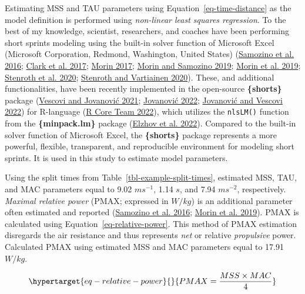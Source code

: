 \documentclass[
  letterpaper,
  DIV=11,
  numbers=noendperiod]{scrartcl}
\begin{document}
Estimating MSS and TAU parameters using Equation~\ref{eq-time-distance}
as the model definition is performed using \emph{non-linear least
squares regression}. To the best of my knowledge, scientist,
researchers, and coaches have been performing short sprints modeling
using the built-in solver function of Microsoft Excel (Microsoft
Corporation, Redmond, Washington, United States)
(\protect\hyperlink{ref-samozinoSimpleMethodMeasuring2016}{Samozino et
al. 2016}; \protect\hyperlink{ref-clarkNFLCombine40Yard2017}{Clark et
al. 2017};
\protect\hyperlink{ref-morinSpreadsheetSprintAcceleration2017}{Morin
2017};
\protect\hyperlink{ref-morinSpreadsheetSprintAcceleration2019}{Morin and
Samozino 2019};
\protect\hyperlink{ref-morinSimpleMethodComputing2019}{Morin et al.
2019};
\protect\hyperlink{ref-stenrothForcevelocityProfilingIce2020}{Stenroth
et al. 2020};
\protect\hyperlink{ref-stenrothSpreadsheetSprintAcceleration2020}{Stenroth
and Vartiainen 2020}). These, and additional functionalities, have been
recently implemented in the open-source \textbf{\{shorts\}} package
(\protect\hyperlink{ref-vescoviSprintMechanicalCharacteristics2021}{Vescovi
and Jovanović 2021}; \protect\hyperlink{ref-R-shorts}{Jovanović 2022};
\protect\hyperlink{ref-jovanovic2022}{Jovanović and Vescovi 2022}) for
R-language (\protect\hyperlink{ref-R-base}{R Core Team 2022}), which
utilizes the \texttt{nlsLM()} function from the \textbf{\{minpack.lm\}}
package (\protect\hyperlink{ref-R-minpack.lm}{Elzhov et al. 2022}).
Compared to the built-in solver function of Microsoft Excel, the
\textbf{\{shorts\}} package represents a more powerful, flexible,
transparent, and reproducible environment for modeling short sprints. It
is used in this study to estimate model parameters.

Using the split times from Table~\ref{tbl-example-split-times},
estimated MSS, TAU, and MAC parameters equal to 9.02 \(ms^{-1}\), 1.14
\(s\), and 7.94 \(ms^{-2}\), respectively. \emph{Maximal relative power}
(PMAX; expressed in \(W/kg\)) is an additional parameter often estimated
and reported
(\protect\hyperlink{ref-samozinoSimpleMethodMeasuring2016}{Samozino et
al. 2016}; \protect\hyperlink{ref-morinSimpleMethodComputing2019}{Morin
et al. 2019}). PMAX is calculated using
Equation~\ref{eq-relative-power}. This method of PMAX estimation
disregards the air resistance and thus represents \emph{net} or relative
\emph{propulsive} power. Calculated PMAX using estimated MSS and MAC
parameters equal to 17.91 \(W/kg\).

\begin{equation}\protect\hypertarget{eq-relative-power}{}{
  PMAX = \frac{MSS \times MAC}{4} 
}\label{eq-relative-power}\end{equation}
\end{document}
